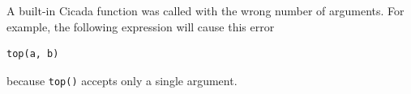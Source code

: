 \documentclass{article}
\newenvironment{code}{
       \begin{list}{}{
               \setlength{\leftmargin}{.4in}
               \setlength{\rightmargin}{0in}
               \setlength{\topsep}{.2in}
       }
       \small
       \item[] }
       { \end{list}   }
\begin{document}
A built-in Cicada function was called with the wrong number of arguments.  For example, the following expression will cause this error

\begin{code} \begin{verbatim}
top(a, b)
\end{verbatim} \end{code}

\noindent because \verb#top()# accepts only a single argument.\\







\printindex
\end{document}
